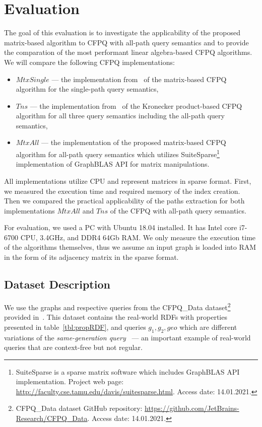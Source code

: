 \section{Evaluation}
The goal of this evaluation is to investigate the applicability of the proposed matrix-based algorithm to CFPQ with all-path query semantics and to provide the comparation of the most performant linear algebra-based CFPQ algorithms. We will compare the following CFPQ implementations:
\begin{itemize}
	\item $MtxSingle$ --- the implementation from~\cite{10.1145/3398682.3399163} of the matrix-based CFPQ algorithm for the single-path query semantics,
	\item $Tns$ --- the implementation from~\cite{kron} of the Kronecker product-based CFPQ algorithm for all three query semantics including the all-path query semantics,
	\item $MtxAll$ --- the implementation of the proposed matrix-based CFPQ algorithm for all-path query semantics which utilizes SuiteSparse\footnote{SuiteSparse is a sparse matrix software which includes GraphBLAS API implementation. Project web page: \url{http://faculty.cse.tamu.edu/davis/suitesparse.html}. Access date: 14.01.2021.}~\cite{Davis2018Algorithm9S} implementation of GraphBLAS API for matrix manipulations.
\end{itemize}

All implementations utilize CPU and represent matrices in sparse format. First, we measured the execution time and required memory of the index creation. Then we compared the practical applicability of the paths extraction for both implementations $MtxAll$ and $Tns$ of the CFPQ with all-path query semantics.

For evaluation, we used a PC with Ubuntu 18.04 installed.
It has Intel core i7-6700 CPU, 3.4GHz, and DDR4 64Gb RAM.
We only measure the execution time of the algorithms themselves, thus we assume an input graph is loaded into RAM in the form of its adjacency matrix in the sparse format.

\subsection{Dataset Description}

We use the graphs and respective queries from the CFPQ\_Data dataset\footnote{CFPQ\_Data dataset GitHub repository: \url{https://github.com/JetBrains-Research/CFPQ_Data}. Access date: 14.01.2021.} provided in~\cite{10.1145/3398682.3399163}. This dataset contains the real-world RDFs with properties presented in table~\ref{tbl:propRDF}, and queries $g_1, g_2, geo$ 
which are different variations of the \textit{same-generation query}~\cite{FndDB} --- an important example of real-world queries that are context-free but not regular.




